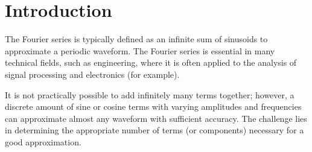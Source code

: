 \documentclass[a4paper, onecolumn, 12pt]{IEEEtran}
\begin{document}
\sloppy


\lstset{language=Python}
\lstset{numbers=left}
\lstset{basicstyle=\small}
\lstset{breaklines=true, breakatwhitespace=false}
\lstset{xleftmargin=7mm,linewidth=\textwidth,xrightmargin=7mm}




\renewcommand\theFancyVerbLine{\small\arabic{FancyVerbLine}}







\pagestyle{plain}
\setcounter{tocdepth}{2}
\tableofcontents
\clearpage
{}
\setcounter{page}{1}
\pagestyle{fancy}


\section{Introduction}
\label{sec:introduction}
The Fourier series is typically defined as an infinite sum of sinusoids to approximate a periodic waveform. The Fourier series is essential in many technical fields, such as engineering, where it is often applied to the analysis of signal processing and electronics (for example).\cite{eli}

It is not practically possible to add infinitely many terms together; however, a discrete amount of sine or cosine terms with varying amplitudes and frequencies can approximate almost any waveform with sufficient accuracy. The challenge lies in determining the appropriate number of terms (or components) necessary for a good approximation. 
\end{document}
